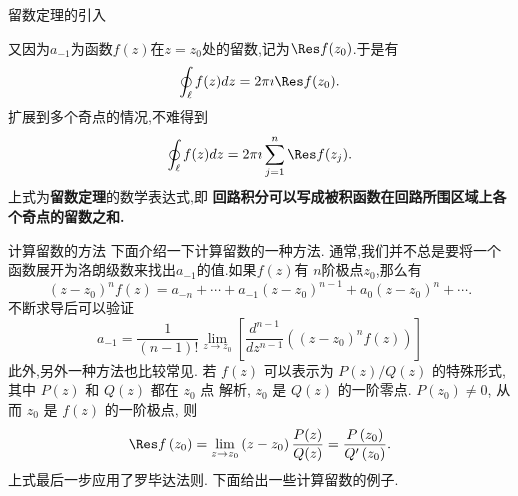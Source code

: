 \documentclass[fontset=windows, chinese, 10pt]{beamer}
\begin{document}
\begin{frame}{留数定理的引入}
  \small


又因为$a_{-1}$为函数$f(z)$在$z=z_0$处的留数,记为$\Res f(z_0)$.于是有
\begin{equation}
    \oint_\ell f(z) dz = 2\pi \imath \Res f(z_0) .
\end{equation}
扩展到多个奇点的情况,不难得到
\begin{equation}
    \oint_\ell f(z) dz = 2\pi \imath \sum_{j=1}^{n} \Res f(z_j) .
\end{equation}
上式为\textbf{留数定理}的数学表达式,即
\textbf{回路积分可以写成被积函数在回路所围区域上各个奇点的留数之和.}

\end{frame}

\begin{frame}{计算留数的方法}
  \small
  下面介绍一下计算留数的一种方法.
通常,我们并不总是要将一个函数展开为洛朗级数来找出$a_{-1}$的值.如果$f(z)$有
$n$阶极点$z_0$,那么有
\begin{equation}
    \left(z-z_0\right)^n f(z)=a_{-n}+\cdots+a_{-1}\left(z-z_0\right)^{n-1}+a_0\left(z-z_0\right)^n+\cdots .
\end{equation}
不断求导后可以验证
\begin{equation}
    a_{-1}=\frac{1}{(n-1) !} \lim _{z \to z_0}\left[\frac{d^{n-1}}{d z^{n-1}}\left(\left(z-z_0\right)^n f(z)\right)\right]
\end{equation}
此外,另外一种方法也比较常见. 若 $f(z)$ 可以表示为 $P(z) / Q(z)$ 的特殊形式, 其中 $P(z)$ 和 $Q(z)$ 都在 $z_0$ 点 解析, $z_0$ 是 $Q(z)$ 的一阶零点. $P\left(z_0\right) \neq 0$, 从而 $z_0$ 是 $f(z)$ 的一阶极点, 则
\begin{equation}
    \Res f\left(z_0\right)=\lim _{z \to z_0}\left(z-z_0\right) \frac{P(z)}{Q(z)}=\frac{P\left(z_0\right)}{Q^{\prime}\left(z_0\right)} .
\end{equation}
上式最后一步应用了罗毕达法则.
下面给出一些计算留数的例子.

\end{frame}
\end{document}
